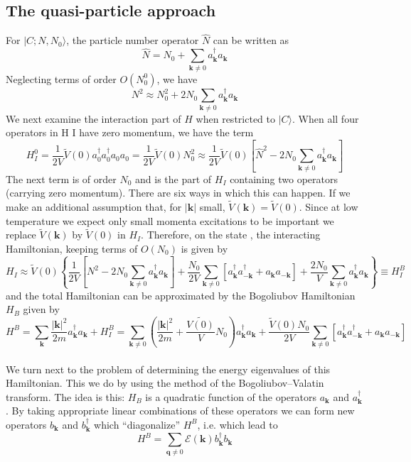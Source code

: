 \subsection{The quasi-particle approach}
For $|C;N,N_0\rangle$, the particle number operator $\hat{N}$ can be written as
\[\hat{N} = N_0 + \sum_{\bm{k}\neq 0}a_{\bm{k}}^{\dagger} a_{\bm{k}} \]
Neglecting terms of order $O(N_0^0)$, we have
\[N^2 \approx N_0^2 + 2N_0\sum_{\bm{k}\neq 0}a_{\bm{k}}^{\dagger} a_{\bm{k}} \]
We next examine the interaction part of $H$ when restricted to $|C\rangle$. When all four operators in H I have zero momentum, we have the term
\[H_I^0 = \frac{1}{2V} \tilde{V}(0) a^{\dagger}_{0} a^{\dagger}_{0} a_{0} a_{0} = \frac{1}{2V}\tilde{V}(0)N_0^2 \approx  \frac{1}{2V}\tilde{V}(0) \left[\hat{N}^2-2N_0\sum_{\bm{k}\neq 0}a_{\bm{k}}^{\dagger} a_{\bm{k}} \right]\]
The next term is of order $N_0$ and is the part of $H_I$ containing two operators (carrying zero momentum). There are six ways in which this can happen. If we make an additional assumption that, for $|\bm{k}|$ small, $\tilde{V}(\bm{k}) = \tilde{V}(0)$. 
Since at low temperature we expect only small momenta excitations to be important we replace $\tilde{V}(\bm{k})$ by $\tilde{V}(0)$ in $H_I$. Therefore, on the state , the interacting Hamiltonian, keeping terms of $O(N_0)$ is given by
\[H_I \approx \tilde{V}(0) \left\{ \frac{1}{2V}\left[N^2-2N_0\sum_{\bm{k}\neq 0}a_{\bm{k}}^{\dagger} a_{\bm{k}} \right]  +\frac{N_0}{2V}\sum_{\bm{k}\neq 0} [a^{\dagger}_{\bm{k}} a^{\dagger}_{-\bm{k}} + a_{\bm{k}} a_{-\bm{k}}] +\frac{2N_0}{V} \sum_{\bm{k}\neq 0}a_{\bm{k}}^{\dagger} a_{\bm{k}} \right\} \equiv H_I^B \] 
and the total Hamiltonian can be approximated by the Bogoliubov Hamiltonian $H_B$ given by
\[H^B = \sum_{\bm{k}} \frac{|\bm{k}|^2}{2m} a_{\bm{k}}^{\dagger} a_{\bm{k}} + H_I^B = \sum_{\bm{k}\neq 0} \left(\frac{|\bm{k}|^2}{2m} + \frac{\tilde{V(0)}}{V}N_0 \right)a_{\bm{k}}^{\dagger} a_{\bm{k}}  + \frac{\tilde{V}(0)N_0}{2V} \sum_{\bm{k}\neq 0} [a^{\dagger}_{\bm{k}} a^{\dagger}_{-\bm{k}} + a_{\bm{k}} a_{-\bm{k}}]\]
\\
We turn next to the problem of determining the energy eigenvalues of this Hamiltonian. This we do by using the method of the Bogoliubov–Valatin transform. 
The idea is this: $H_B$ is a quadratic function of the operators $a_{\bm{k}}$ and $a^{\dagger}_{\bm{k}}$. 
By taking appropriate linear combinations of these operators we can form new operators $b_{\bm{k}}$ and $b^{\dagger}_{\bm{k}}$ which ``diagonalize'' $H^B$, i.e. which lead to
\[H^B = \sum_{\bm{q} \neq 0} \mathcal{E}(\bm{k})b^{\dagger}_{\bm{k}} b_{\bm{k}} \]
